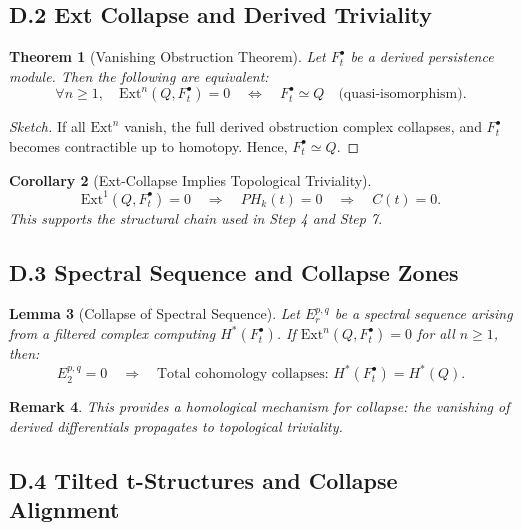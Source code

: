 \documentclass[11pt]{article}
\newtheorem{theorem}{Theorem}[section]
\newtheorem{remark}[theorem]{Remark}
\newtheorem{lemma}[theorem]{Lemma}
\newtheorem{corollary}[theorem]{Corollary}
\begin{document}
\subsection*{D.2 Ext Collapse and Derived Triviality}

\begin{theorem}[Vanishing Obstruction Theorem]
Let $F^\bullet_t$ be a derived persistence module. Then the following are equivalent:
\[
\forall n \geq 1,\quad \mathrm{Ext}^n(Q, F^\bullet_t) = 0
\quad \Longleftrightarrow \quad
F^\bullet_t \simeq Q \quad \text{(quasi-isomorphism)}.
\]
\end{theorem}

\begin{proof}[Sketch]
If all $\mathrm{Ext}^n$ vanish, the full derived obstruction complex collapses, and $F^\bullet_t$ becomes contractible up to homotopy. Hence, $F^\bullet_t \simeq Q$.
\end{proof}

\begin{corollary}[Ext-Collapse Implies Topological Triviality]
\[
\mathrm{Ext}^1(Q, F^\bullet_t) = 0 \quad \Rightarrow \quad PH_k(t) = 0 \quad \Rightarrow \quad C(t) = 0.
\]
This supports the structural chain used in Step 4 and Step 7.
\end{corollary}

\subsection*{D.3 Spectral Sequence and Collapse Zones}

\begin{lemma}[Collapse of Spectral Sequence]
Let $E_r^{p,q}$ be a spectral sequence arising from a filtered complex computing $H^*(F^\bullet_t)$.  
If $\mathrm{Ext}^n(Q, F^\bullet_t) = 0$ for all $n \geq 1$, then:
\[
E_2^{p,q} = 0 \quad \Rightarrow \quad \text{Total cohomology collapses: } H^*(F^\bullet_t) = H^*(Q).
\]
\end{lemma}

\begin{remark}
This provides a homological mechanism for collapse: the vanishing of derived differentials propagates to topological triviality.
\end{remark}

\subsection*{D.4 Tilted t-Structures and Collapse Alignment}
\end{document}
